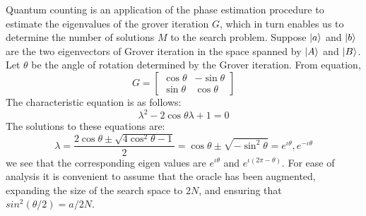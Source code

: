 Quantum counting is an application of the phase estimation procedure to estimate the eigenvalues of the grover iteration $G$, which in turn enables us to determine the number of solutions $M$ to the search problem. Suppose $\ket{a}$ and $\ket{b}$ are the two eigenvectors of Grover iteration in the space spanned by $\ket{A}$ and $\ket{B}$. Let $\theta$ be the angle of rotation determined by the Grover iteration. From equation, 
\[
G=\begin{bmatrix} \cos\theta & -\sin \theta \\ \sin \theta & \cos \theta \end{bmatrix}
\]
The characteristic equation is as follows:
\[
\lambda^2 -2\cos \theta \lambda + 1 = 0 
\]
The solutions to these equations are:
\[
\lambda = \frac{2\cos \theta \pm \sqrt{4\cos^2 \theta -1 }}{2} = \cos \theta \pm \sqrt{-\sin^2 \theta} = e^{\iota \theta} , e^{-\iota \theta}
\]
we see that the corresponding eigen values are $e^{\iota \theta}$ and $e^{\iota (2\pi-\theta)}$. For ease of analysis it is convenient to assume that the oracle has been augmented, expanding the size of the search space to $2N$, and ensuring that $sin^2(\theta/2)=a/2N$.


